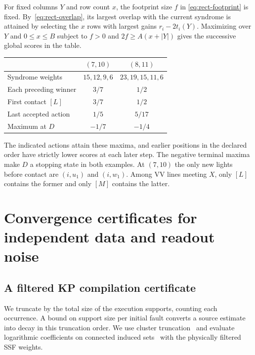 \documentclass[10pt,twocolumn]{article}
\theoremstyle{definition}
\begin{document}
For fixed columns $Y$ and row count $x$, the footprint size $f$ in
\eqref{eq:rect-footprint} is fixed. By~\eqref{eq:rect-overlap}, its
largest overlap with the current syndrome is attained by selecting the
$x$ rows with largest gains $r_i-2t_i(Y)$. Maximizing over $Y$ and
$0\le x\le B$ subject to $f>0$ and $2f\ge A(x+|Y|)$ gives the
successive global scores in the table.
\begin{center}\small
\begin{tabular}{@{}lcc@{}}
\toprule
 & $(7,10)$ & $(8,11)$\\
\midrule
Syndrome weights & $15,12,9,6$ & $23,19,15,11,6$\\
Each preceding winner & $3/7$ & $1/2$\\
First contact $[L]$ & $3/7$ & $1/2$\\
Last accepted action & $1/5$ & $5/17$\\
Maximum at $D$ & $-1/7$ & $-1/4$\\
\bottomrule
\end{tabular}
\end{center}
The indicated actions attain these maxima, and earlier positions in
the declared order have strictly lower scores at each later step.
The negative terminal maxima make $D$ a stopping state in both
examples. At $(7,10)$ the only new lights before contact are $(i,u_1)$
and $(i,w_1)$. Among VV lines meeting $X$, only $[L]$ contains the
former and only $[M]$ contains the latter.

\section{Convergence certificates for independent data and readout noise}\label{app:uniform}
\subsection{A filtered KP compilation certificate}\label{app:filtered-kp}

We truncate by the total size of the execution supports, counting
each occurrence. A bound on support size per initial fault converts
a source estimate into decay in this truncation order. We use cluster
truncation~\cite[Sec.~2]{HPR20} and evaluate logarithmic coefficients
on connected induced sets~\cite[Thm.~3.2 and Lemmas~4.1--4.4]{YYZ22}
with the physically filtered SSF weights.
\end{document}
